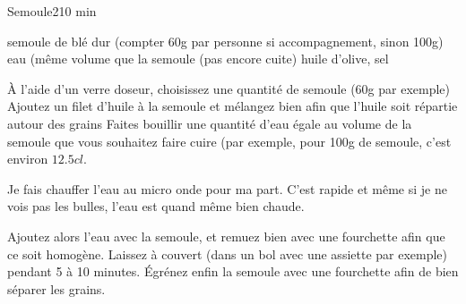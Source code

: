\begin{recette}{Semoule}{2}{10 min}{}
\begin{ingredients}
\ingredient semoule de blé dur (compter 60g par personne si accompagnement, sinon 100g)
\ingredient eau (même volume que la semoule (pas encore cuite)
\ingredient huile d'olive, sel
\end{ingredients}

\begin{preparation}
\etape À l'aide d'un verre doseur, choisissez une quantité de semoule (60g par exemple)
\etape Ajoutez un filet d'huile à la semoule et mélangez bien afin que l'huile soit répartie autour des grains
\etape Faites bouillir une quantité d'eau égale au volume de la semoule que vous souhaitez faire cuire (par exemple, pour 100g de semoule, c'est environ $12.5\unit{cl}$. 
\begin{remarque}
Je fais chauffer l'eau au micro onde pour ma part. C'est rapide et même si je ne vois pas les bulles, l'eau est quand même bien chaude. 
\end{remarque}
\etape Ajoutez alors l'eau avec la semoule, et remuez bien avec une fourchette afin que ce soit homogène. Laissez à couvert (dans un bol avec une assiette par exemple) pendant 5 à 10 minutes.
\etape Égrénez enfin la semoule avec une fourchette afin de bien séparer les grains.
\end{preparation}
\end{recette}
